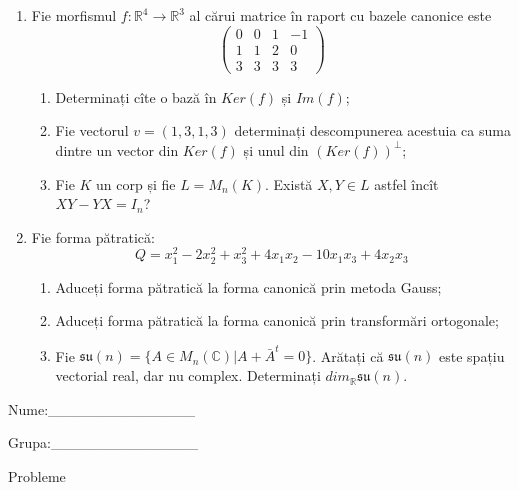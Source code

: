 \documentclass{article}
\begin{document}
\begin{enumerate}
 \item Fie morfismul $f:\mathbb{R}^4 \to \mathbb{R}^3$ al cărui matrice în raport cu bazele canonice este
$$\begin{pmatrix}
0&0&1&-1\\
1&1&2&0\\
3&3&3&3
\end{pmatrix}$$

\begin{enumerate}
\item Determinați cîte o bază în $Ker(f)$ și $Im(f)$;
\item Fie vectorul $v=(1,3,1,3)$ determinați descompunerea acestuia ca suma dintre un vector din $Ker(f)$ și unul din $(Ker(f))^\perp$;
\item Fie $K$ un corp și fie $L=M_n(K)$. Există $X,Y \in L$ astfel încît $XY-YX=I_n$?  
\end{enumerate}
\item Fie forma pătratică:
$$Q= x_1^2-2x_2^2+x_3^2+4x_1x_2-10x_1x_3+4x_2x_3$$

\begin{enumerate}
\item Aduceți forma pătratică la forma canonică prin metoda Gauss;
\item Aduceți forma pătratică la forma canonică prin transformări ortogonale;
\item Fie $\mathfrak{su}(n)=\{ A \in M_n(\mathbb{C}) | A+\bar{A}^t=0\}$. Arătați că $\mathfrak{su}(n)$ este spațiu vectorial real, dar nu complex.
Determinați $dim_{\mathbb{R}}\mathfrak{su}(n)$.
\end{enumerate}
\end{enumerate}
\newpage
\begin{flushright}
Nume:\_\_\_\_\_\_\_\_\_\_\_\_\_\_
 
 
Grupa:\_\_\_\_\_\_\_\_\_\_\_\_\_\_
\end{flushright}
\begin{center}
\vspace{2cm}
{\Large Probleme}
\vspace{2cm}
\end{center}
\end{document}
